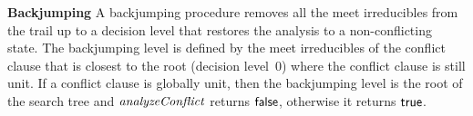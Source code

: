 \noindent \textbf{Backjumping}
A backjumping procedure removes all the meet irreducibles from 
the trail up to a decision level that restores the analysis to a
non-conflicting state.  The backjumping level is defined by the
meet irreducibles of the conflict clause that is closest 
to the root (decision level~0) where the conflict
clause is still unit.  If a conflict clause is globally unit, then the
backjumping level is the root of the search tree and
$\mathit{analyzeConflict}$ returns $\mathsf{false}$, otherwise it returns $\mathsf{true}$.
